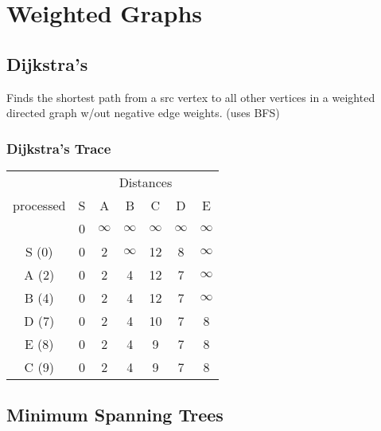 \section{Weighted Graphs}
\subsection*{Dijkstra's}
Finds the shortest path from a src vertex to all other vertices in a weighted
directed graph w/out negative edge weights. (uses BFS)

\subsubsection*{Dijkstra's Trace}


\begin{tabular}{@{} ccccccc @{}}
     & \multicolumn{6}{c}{Distances}\\
    {\scriptsize processed} & S & A & B & C & D & E\\
    \toprule
      & 0 & $\infty$ & $\infty$ & $\infty$ & $\infty$ & $\infty$ \\
    S (0) & 0 & 2 & $\infty$ & 12 & 8 & $\infty$ \\
    A (2) & 0 & 2 & 4 & 12 & 7 & $\infty$ \\
    B (4) & 0 & 2 & 4 & 12 & 7 & $\infty$ \\
    D (7) & 0 & 2 & 4 & 10 & 7 & 8\\
    E (8) & 0 & 2 & 4 & 9 & 7 & 8\\
    C (9) & 0 & 2 & 4 & 9 & 7 & 8
\end{tabular}

\subsection*{Minimum Spanning Trees}

